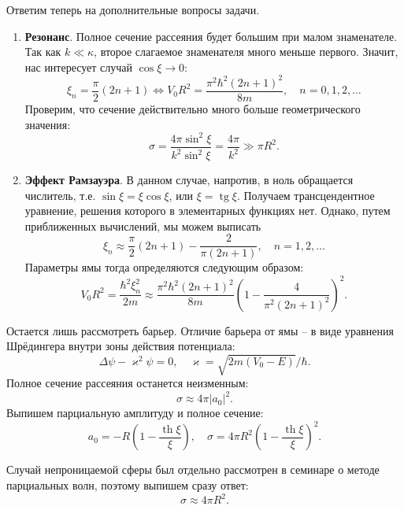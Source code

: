 Ответим теперь на дополнительные вопросы задачи.
\begin{enumerate}
  \item \textbf{Резонанс}. Полное сечение рассеяния будет большим при малом
        знаменателе. Так как $k\ll\kappa$, второе слагаемое знаменателя много меньше
        первого. Значит, нас интересует случай $\cos\xi\to0$:
        \[
          \xi_n = \frac{\pi}{2}(2n+1) \Longleftrightarrow V_0R^2 =
          \frac{\pi^2\hbar^2(2n+1)^2}{8m}, \quad n = 0,1,2,\dots
        \]
        Проверим, что сечение действительно много больше геометрического значения:
        \[
          \sigma = \frac{4\pi\sin^2\xi}{k^2\sin^2\xi} =
          \frac{4\pi}{k^2}\gg\pi R^2.
        \]

  \item \textbf{Эффект Рамзауэра}. В данном случае, напротив, в ноль обращается
        числитель, т.е. $\sin\xi=\xi\cos\xi$, или $\xi=\operatorname{tg}\xi$. Получаем
        трансцендентное уравнение, решения которого в элементарных функциях нет.
        Однако, путем приближенных вычислений, мы можем выписать
        \[
          \xi_n\approx\frac{\pi}{2}(2n+1)-\frac{2}{\pi(2n+1)}, \quad n = 1,2,\dots
        \]
        Параметры ямы тогда определяются следующим образом:
        \[
          V_0R^2 = \frac{\hbar^2\xi_n^2}{2m}\approx
          \frac{\pi^2\hbar^2(2n+1)^2}{8m}\left(1-\frac{4}{\pi^2(2n+1)^2}\right)^2.
        \]
\end{enumerate}

Остается лишь рассмотреть барьер. Отличие барьера от ямы -- в виде уравнения
Шрёдингера внутри зоны действия потенциала:
\[
  \Delta\psi-\varkappa^2\psi = 0, \quad \varkappa = \sqrt{2m(V_0-E)}/\hbar.
\]
Полное сечение рассеяния останется неизменным:
\[
  \sigma\approx4\pi|a_0|^2.
\]
Выпишем парциальную амплитуду и полное сечение:
\[
  a_0 = -R\left(1-\frac{\operatorname{th}\xi}{\xi}\right),
  \quad \sigma = 4\pi R^2\left(1-\frac{\operatorname{th}\xi}{\xi}\right)^2.
\]

Случай непроницаемой сферы был отдельно рассмотрен в семинаре о методе
парциальных волн, поэтому выпишем сразу ответ:
\[
  \sigma\approx4\pi R^2.
\]
\qedsq
